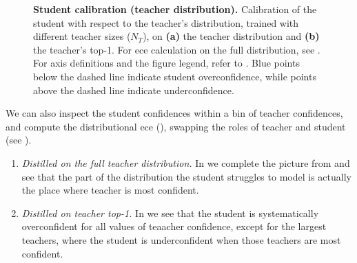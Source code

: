 \begin{figure}[h]
	\centering
    \vspace{-0.1cm}
	\hfill
    \vspace{-0.1cm}
	\caption{\textbf{Student calibration (teacher distribution).} Calibration of the student with respect to the teacher's distribution, trained with different teacher sizes ($N_T$), on \textbf{(a)} the teacher distribution and \textbf{(b)} the teacher's top-1. For \gls{ece} calculation on the full distribution, see . For axis definitions and the figure legend, refer to . Blue points below the dashed line indicate student overconfidence, while points above the dashed line indicate underconfidence.}
	\label{fig:calibration-student-tdist-20n}
    \vspace{-0.1cm}
\end{figure}

We can also inspect the student confidences within a bin of teacher confidences, and compute the distributional \gls{ece} (), swapping the roles of teacher and student (see ).
\begin{enumerate}
  \item \emph{Distilled on the full teacher distribution.} In  we complete the picture from  and see that the part of the distribution the student struggles to model is actually the place where teacher is most confident.
  \item \emph{Distilled on teacher top-1.} In  we see that the student is systematically overconfident for all values of teaacher confidence, except for the largest teachers, where the student is underconfident when those teachers are most confident.
\end{enumerate}

